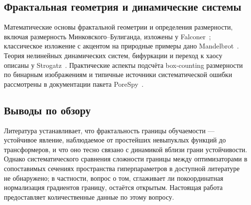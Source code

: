 \subsection{Фрактальная геометрия и динамические системы}

Математические основы фрактальной геометрии и определения размерности, включая
размерность Минковского--Булиганда, изложены у Falconer~\cite{falconer2014};
классическое изложение с акцентом на природные примеры дано
Mandelbrot~\cite{mandelbrot1982}. Теория нелинейных динамических систем,
бифуркации и переход к хаосу описаны у Strogatz~\cite{strogatz2015}.
Практические аспекты подсчёта box-counting размерности по бинарным изображениям
и типичные источники систематической ошибки рассмотрены в документации
пакета PoreSpy~\cite{porespy2019}.

\subsection{Выводы по обзору}

Литература устанавливает, что фрактальность границы обучаемости --- устойчивое
явление, наблюдаемое от простейших невыпуклых функций до трансформеров, и что
оно тесно связано с динамикой вблизи грани устойчивости. Однако
систематического сравнения сложности границы между оптимизаторами в
сопоставимых сечениях пространства гиперпараметров в доступной литературе не
обнаружено; в частности, вопрос о том, сглаживает ли покоординатная
нормализация градиентов границу, остаётся открытым. Настоящая работа
предоставляет количественные данные по этому вопросу.

